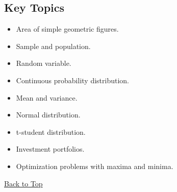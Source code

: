 \subsection{Key Topics}\label{sec:grade11-term3-topics}

\begin{itemize}
	\item Area of simple geometric figures.
	\item Sample and population.
	\item Random variable.
	\item Continuous probability distribution.
	\item Mean and variance.
	\item Normal distribution.
	\item t-student distribution.
	\item Investment portfolios.
	\item Optimization problems with maxima and minima.
\end{itemize}

\vspace{6pt}
\noindent\hyperref[table-of-contents]{Back to Top}

